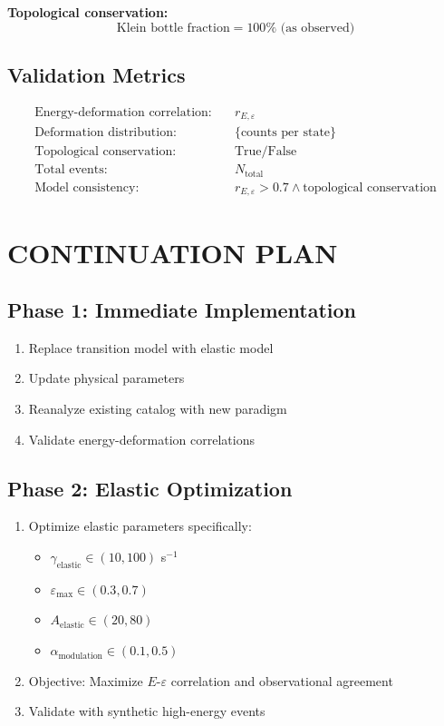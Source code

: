 \documentclass[12pt,a4paper]{article}
\begin{document}
\textbf{Topological conservation:}
\begin{equation}
\text{Klein bottle fraction} = 100\% \text{ (as observed)}
\end{equation}

\subsection{Validation Metrics}

\begin{align}
\text{Energy-deformation correlation:} &\quad r_{E,\varepsilon}\\
\text{Deformation distribution:} &\quad \{\text{counts per state}\}\\
\text{Topological conservation:} &\quad \text{True/False}\\
\text{Total events:} &\quad N_{\text{total}}\\
\text{Model consistency:} &\quad r_{E,\varepsilon} > 0.7 \land \text{topological conservation}
\end{align}

\section{CONTINUATION PLAN}

\subsection{Phase 1: Immediate Implementation}

\begin{enumerate}
\item Replace transition model with elastic model
\item Update physical parameters
\item Reanalyze existing catalog with new paradigm
\item Validate energy-deformation correlations
\end{enumerate}

\subsection{Phase 2: Elastic Optimization}

\begin{enumerate}
\item Optimize elastic parameters specifically:
\begin{itemize}
\item $\gamma_{\text{elastic}} \in (10, 100)$ s$^{-1}$
\item $\varepsilon_{\max} \in (0.3, 0.7)$
\item $A_{\text{elastic}} \in (20, 80)$
\item $\alpha_{\text{modulation}} \in (0.1, 0.5)$
\end{itemize}
\item Objective: Maximize $E$-$\varepsilon$ correlation and observational agreement
\item Validate with synthetic high-energy events
\end{enumerate}
\end{document}
